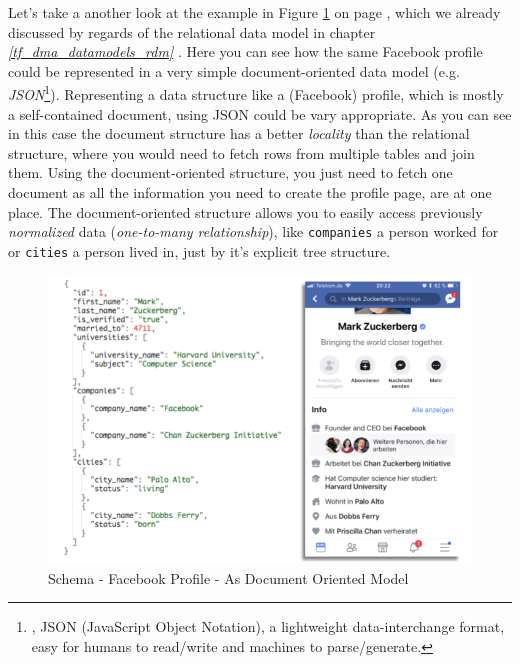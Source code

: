 {Let's take a another look at the example in Figure \ref{schema_facebook_document_oriented_model} on page \pageref{schema_facebook_document_oriented_model}, which we already discussed by regards of the relational data model in chapter \textit{\ref{tf_dma_datamodels_rdm} }. Here you can see how the same Facebook profile could be represented in a very simple document-oriented data model (e.g. \textit{JSON}\footnote{\cite{JSONW}, JSON (JavaScript Object Notation), a lightweight data-interchange format, easy for humans to read/write and machines to parse/generate.}). Representing a data structure like a (Facebook) profile, which is mostly a self-contained document, using JSON could be vary appropriate. As you can see in this case the document structure has a better \textit{locality} than the relational structure, where you would need to fetch rows from multiple tables and join them. Using the document-oriented structure, you just need to fetch one document as all the information you need to create the profile page, are at one place. The document-oriented structure allows you to easily access previously \textit{normalized} data (\textit{one-to-many relationship}), like \lstinline{companies} a person worked for or \lstinline{cities} a person lived in, just by it's explicit tree structure.\\

\begin{figure}[ht]
	\centering
  \includegraphics[width=1\textwidth]{document_oriented_data_model_zuckerberg.png}
	\caption{Schema - Facebook Profile - As Document Oriented Model}
	\label{schema_facebook_document_oriented_model}
\end{figure}

}
